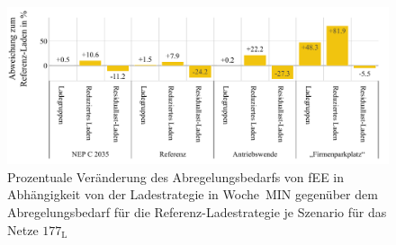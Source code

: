 \begin{figure}[H]
    \centering
    \includegraphics[width=\textwidth]{Bilder/177_cur_fee_grid_week_A}
    \caption[Prozentuale Veränderung des Abregelungsbedarfs von fEE in Abhängigkeit von der Ladestrategie in Woche~MIN gegenüber dem Abregelungsbedarf für die Referenz-Ladestrategie je Szenario für das Netze \num{177}]{Prozentuale Veränderung des Abregelungsbedarfs von fEE in Abhängigkeit von der Ladestrategie in Woche~MIN gegenüber dem Abregelungsbedarf für die Referenz-Ladestrategie je Szenario für das Netze \(177_{\text{L}}\)}\label{fig:177_cur_fee_grid_week_A}
\end{figure}